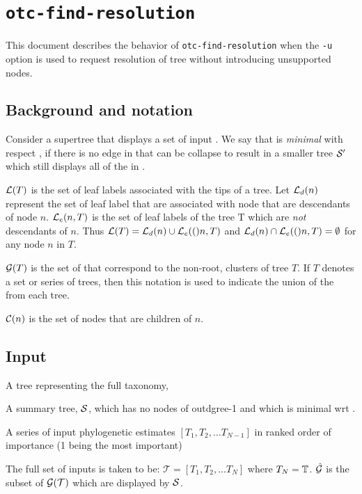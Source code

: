 \documentclass[11pt]{article}
\begin{document}
\section*{\texttt{otc-find-resolution}}
This document describes the behavior of \texttt{otc-find-resolution} when the \texttt{-u}
    option is used to request resolution of tree without introducing unsupported nodes.

\subsection*{Background and notation}
Consider a supertree \summaryTree that displays a set of input \pss \pssInOptimalTree.
We say that \summaryTree is {\em minimal} with respect \pssInOptimalTree, if there is
    no edge in \summaryTree that can be collapse to result in a smaller tree $\mathcal{S}^{\prime}$
    which still displays all of the \pss in \pssInOptimalTree.

$\mathcal{L}(T)$ is the set of leaf labels associated with the tips of a tree.
Let $\mathcal{L}_d(n)$ represent the set of leaf label that are associated with node that are descendants
    of node $n$.
$\mathcal{L}_e(n, T)$ is the set of leaf labels of the tree T which are {\em not} descendants of $n$.
Thus $\mathcal{L}(T) = \mathcal{L}_d(n) \cup \mathcal{L}_e(()n, T)$ and $\mathcal{L}_d(n) \cap \mathcal{L}_e(()n, T)=\emptyset$ for any node $n$ in $T$.

$\mathcal{G}(T)$ is the set of \pss that correspond to the non-root, clusters of tree $T$.
If $T$ denotes a set or series of trees, then this notation is used to indicate the union of the \pss from each tree.

$\mathcal{C}(n)$ is the set of nodes that are children of $n$.

\subsection*{Input}
\begin{compactitem}
    \item A tree representing the full taxonomy, \taxonomy
    \item A summary tree, $\mathcal{S}$, which has no nodes of outdgree-1 and which is minimal wrt \pssInOptimalTree.
    \item A series of input phylogenetic estimates  $[T_1, T_2, \ldots T_{N-1}]$ in ranked order of importance (1 being the most important)
\end{compactitem}
The full set of inputs is taken to be: $\mathcal{T} = [T_1, T_2, \ldots T_{N}]$ where $T_N = \mathbb{T}$.
    $\hat{\mathcal{G}}$ is the subset of $\mathcal{G}(\mathcal{T})$ which are displayed by $\mathcal{S}$.
\end{document}
